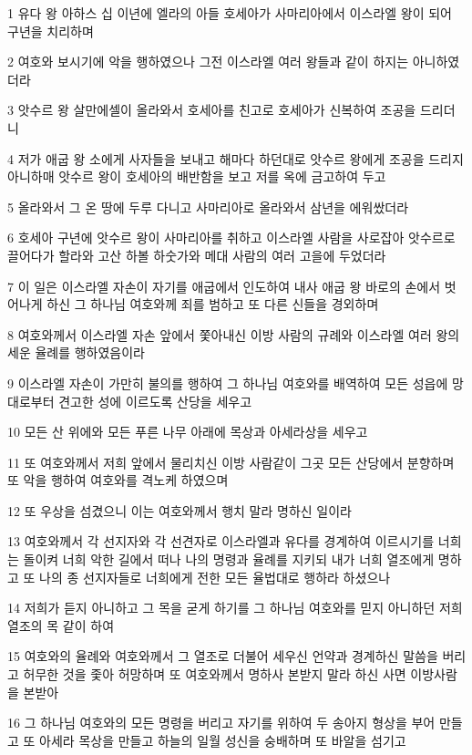 \par 1 유다 왕 아하스 십 이년에 엘라의 아들 호세아가 사마리아에서 이스라엘 왕이 되어 구년을 치리하며
\par 2 여호와 보시기에 악을 행하였으나 그전 이스라엘 여러 왕들과 같이 하지는 아니하였더라
\par 3 앗수르 왕 살만에셀이 올라와서 호세아를 친고로 호세아가 신복하여 조공을 드리더니
\par 4 저가 애굽 왕 소에게 사자들을 보내고 해마다 하던대로 앗수르 왕에게 조공을 드리지 아니하매 앗수르 왕이 호세아의 배반함을 보고 저를 옥에 금고하여 두고
\par 5 올라와서 그 온 땅에 두루 다니고 사마리아로 올라와서 삼년을 에워쌌더라
\par 6 호세아 구년에 앗수르 왕이 사마리아를 취하고 이스라엘 사람을 사로잡아 앗수르로 끌어다가 할라와 고산 하볼 하숫가와 메대 사람의 여러 고을에 두었더라
\par 7 이 일은 이스라엘 자손이 자기를 애굽에서 인도하여 내사 애굽 왕 바로의 손에서 벗어나게 하신 그 하나님 여호와께 죄를 범하고 또 다른 신들을 경외하며
\par 8 여호와께서 이스라엘 자손 앞에서 쫓아내신 이방 사람의 규례와 이스라엘 여러 왕의 세운 율례를 행하였음이라
\par 9 이스라엘 자손이 가만히 불의를 행하여 그 하나님 여호와를 배역하여 모든 성읍에 망대로부터 견고한 성에 이르도록 산당을 세우고
\par 10 모든 산 위에와 모든 푸른 나무 아래에 목상과 아세라상을 세우고
\par 11 또 여호와께서 저희 앞에서 물리치신 이방 사람같이 그곳 모든 산당에서 분향하며 또 악을 행하여 여호와를 격노케 하였으며
\par 12 또 우상을 섬겼으니 이는 여호와께서 행치 말라 명하신 일이라
\par 13 여호와께서 각 선지자와 각 선견자로 이스라엘과 유다를 경계하여 이르시기를 너희는 돌이켜 너희 악한 길에서 떠나 나의 명령과 율례를 지키되 내가 너희 열조에게 명하고 또 나의 종 선지자들로 너희에게 전한 모든 율법대로 행하라 하셨으나
\par 14 저희가 듣지 아니하고 그 목을 굳게 하기를 그 하나님 여호와를 믿지 아니하던 저희 열조의 목 같이 하여
\par 15 여호와의 율례와 여호와께서 그 열조로 더불어 세우신 언약과 경계하신 말씀을 버리고 허무한 것을 좇아 허망하며 또 여호와께서 명하사 본받지 말라 하신 사면 이방사람을 본받아
\par 16 그 하나님 여호와의 모든 명령을 버리고 자기를 위하여 두 송아지 형상을 부어 만들고 또 아세라 목상을 만들고 하늘의 일월 성신을 숭배하며 또 바알을 섬기고
